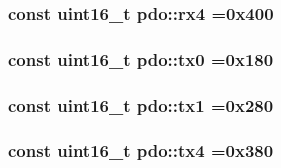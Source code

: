 \subsubsection[{\texorpdfstring{rx4}{rx4}}]{\setlength{\rightskip}{0pt plus 5cm}const uint16\+\_\+t pdo\+::rx4 =0x400}\hypertarget{namespacepdo_ab45e1d027abca75c1d406d514d3f6085}{}\label{namespacepdo_ab45e1d027abca75c1d406d514d3f6085}
\subsubsection[{\texorpdfstring{tx0}{tx0}}]{\setlength{\rightskip}{0pt plus 5cm}const uint16\+\_\+t pdo\+::tx0 =0x180}\hypertarget{namespacepdo_a4a8e678f87bbe2520c5cffe3f6a6dae0}{}\label{namespacepdo_a4a8e678f87bbe2520c5cffe3f6a6dae0}
\subsubsection[{\texorpdfstring{tx1}{tx1}}]{\setlength{\rightskip}{0pt plus 5cm}const uint16\+\_\+t pdo\+::tx1 =0x280}\hypertarget{namespacepdo_ae5f87d5007685cfd9d219e1cb051ccf0}{}\label{namespacepdo_ae5f87d5007685cfd9d219e1cb051ccf0}
\subsubsection[{\texorpdfstring{tx4}{tx4}}]{\setlength{\rightskip}{0pt plus 5cm}const uint16\+\_\+t pdo\+::tx4 =0x380}\hypertarget{namespacepdo_a12b62b143e83e83b2566dea6d20a169a}{}\label{namespacepdo_a12b62b143e83e83b2566dea6d20a169a}
